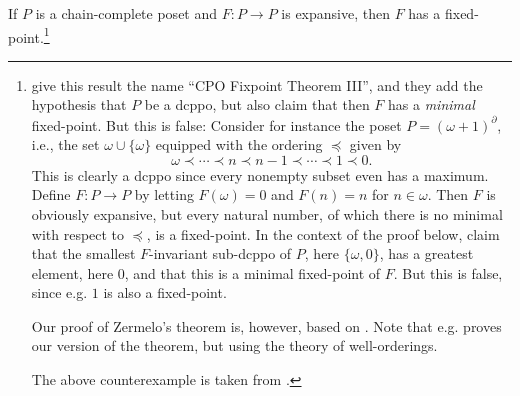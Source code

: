\documentclass[a4paper, 11pt, article, danish, oneside]{memoir}
\newcommand*\union\cup
\begin{document}
\begin{theorem}
    If $P$ is a chain-complete poset and $F \colon P \to P$ is expansive, then $F$ has a fixed-point.\footnote{\Textcite{davey-priestley-order} give this result the name \enquote{CPO Fixpoint Theorem III}, and they add the hypothesis that $P$ be a dcppo, but also claim that then $F$ has a \emph{minimal} fixed-point. But this is false: Consider for instance the poset $P = (\omega+1)^\partial$, i.e., the set $\omega \union \{\omega\}$ equipped with the ordering $\preceq$ given by
    \begin{equation*}
        \omega \prec \cdots \prec n \prec n-1 \prec \cdots \prec 1 \prec 0.
    \end{equation*}
    This is clearly a dcppo since every nonempty subset even has a maximum. Define $F \colon P \to P$ by letting $F(\omega) = 0$ and $F(n) = n$ for $n \in \omega$. Then $F$ is obviously expansive, but every natural number, of which there is no minimal with respect to $\preceq$, is a fixed-point. In the context of the proof below, \citeauthor{davey-priestley-order} claim that the smallest $F$-invariant sub-dcppo of $P$, here $\{\omega, 0\}$, has a greatest element, here $0$, and that this is a minimal fixed-point of $F$. But this is false, since e.g. $1$ is also a fixed-point. \par Our proof of Zermelo's theorem is, however, based on \textcite[Exercise~8.20]{davey-priestley-order}. Note that e.g. \textcite[Theorem~7.35]{moschovakis-set-theory} proves our version of the theorem, but using the theory of well-orderings. \par The above counterexample is taken from \textcite{hansen-zermelo-stackexchange}.}
\end{theorem}
\end{document}
